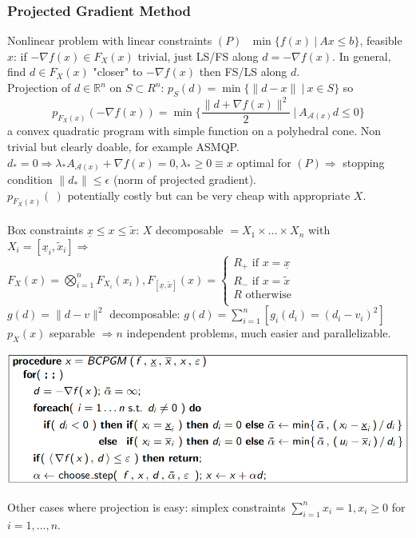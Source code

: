 \documentclass[10pt]{report}
\begin{document}
\subsubsection{Projected Gradient Method} Nonlinear problem with linear constraints $(P)\:\:\:\min\{f(x)\:|\:Ax\leq b\}$, feasible $x$: if $-\nabla f(x)\in F_X(x)$ trivial, just LS/FS along $d=-\nabla f(x)$. In general, find $d\in F_X(x)$ "closer" to $-\nabla f(x)$ then FS/LS along $d$.\\
Projection of $d\in \mathbb{R}^n$ on $S\subset R^n$: $p_S(d)=\min\{\|d-x\|\:|\:x\in S\}$ so $$p_{F_X(x)}(-\nabla f(x))=\min\{\frac{\|d+\nabla f(x)\|^2}{2}\:|\:A_{\mathscr{A}(x)}d\leq 0\}$$
a convex quadratic program with simple function on a polyhedral cone. Non trivial but clearly doable, for example ASMQP. $d_*=0\Rightarrow \lambda_*A_{\mathscr{A}(x)}+\nabla f(x) = 0, \lambda_* \geq 0\equiv x$ optimal for $(P)\Rightarrow$ stopping condition $\|d_*\|\leq \epsilon$ (norm of projected gradient).\\
$p_{F_X(x)}(\:)$ potentially costly but can be very cheap with appropriate $X$.\\\\
Box constraints $\underline{x}\leq x\leq \tilde{x}$: $X$ decomposable $= X_1\times \ldots \times X_n$ with $X_i=[\underline{x}_i, \tilde{x}_i] \Rightarrow$\\$F_X(x) = \bigotimes_{i=1}^n F_{X_i}(x_i), F_{[\underline{x},\tilde{x}]}(x) = \left\{\begin{array}{l}
R_+\text{ if }x=\underline{x}\\
R_-\text{ if }x=\tilde{x}\\
R\text{ otherwise}\\
\end{array} \right.$\\
$g(d) = \|d-v\|^2$ decomposable: $g(d)=\sum_{i=1}^n [g_i(d_i)=(d_i-v_i)^2]$\\
$p_X(x)$ separable $\Rightarrow n$ independent problems, much easier and parallelizable.
\begin{center}
	\includegraphics[scale=0.75]{11.png}
\end{center}
Other cases where projection is easy: simplex constraints $\sum_{i=1}^n x_i = 1, x_i\geq 0$ for $i=1,\ldots,n$.
\end{document}
